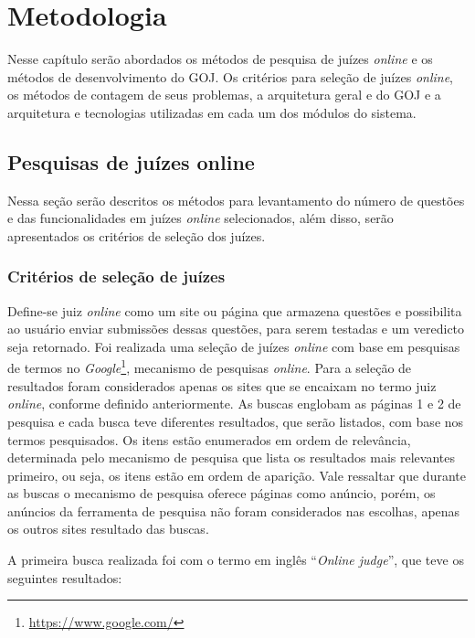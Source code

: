 \chapter{Metodologia}
\label{cap:metodologia}

Nesse capítulo serão abordados os métodos de pesquisa de juízes \textit{online} e os métodos de desenvolvimento do GOJ. Os critérios para seleção de juízes \textit{online}, os métodos de contagem de seus problemas, a arquitetura geral e do GOJ e a arquitetura e tecnologias utilizadas em cada um dos módulos do sistema.

\section{Pesquisas de juízes online}

Nessa seção serão descritos os métodos para levantamento do número de questões e das funcionalidades em juízes \textit{online} selecionados, além disso, serão apresentados os critérios de seleção dos juízes.

\subsection{Critérios de seleção de juízes}
\label{subsec:selecao_juizes}

Define-se juiz \textit{online} como um site ou página que armazena questões e possibilita ao usuário enviar submissões dessas questões, para serem testadas e um veredicto seja retornado. Foi realizada uma seleção de juízes \textit{online} com base em pesquisas de termos no \textit{Google}\footnote{\url{https://www.google.com/}}, mecanismo de pesquisas \textit{online}. Para a seleção de resultados foram considerados apenas os sites que se encaixam no termo juiz \textit{online}, conforme definido anteriormente. As buscas englobam as páginas 1 e 2 de pesquisa e cada busca teve diferentes resultados, que serão listados, com base nos termos pesquisados. Os itens estão enumerados em ordem de relevância, determinada pelo mecanismo de pesquisa que lista os resultados mais relevantes primeiro, ou seja, os itens estão em ordem de aparição. Vale ressaltar que durante as buscas o mecanismo de pesquisa oferece páginas como anúncio, porém, os anúncios da ferramenta de pesquisa não foram considerados nas escolhas, apenas os outros sites resultado das buscas.

A primeira busca realizada foi com o termo em inglês ``\textit{Online judge}'', que teve os seguintes resultados:

